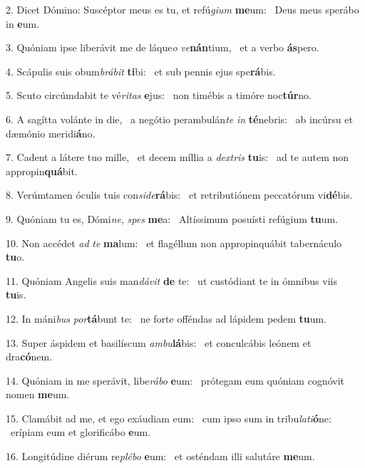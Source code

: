 2. Dicet Dómino: Suscéptor meus es tu, et refú\textit{gi}\textit{um} \textbf{me}um: \ast\  Deus meus sperábo in \textbf{e}um.\

3. Quóniam ipse liberávit me de láque\textit{o} \textit{ve}\textbf{nán}tium, \ast\  et a verbo \textbf{ás}pero.\

4. Scápulis suis obum\textit{brá}\textit{bit} \textbf{ti}bi: \ast\  et sub pennis ejus spe\textbf{rá}bis.\

5. Scuto circúmdabit te vé\textit{ri}\textit{tas} \textbf{e}jus: \ast\  non timébis a timóre noc\textbf{túr}no.\

6. A sagítta volánte in die, \dag\  a negótio perambulán\textit{te} \textit{in} \textbf{té}nebris: \ast\  ab incúrsu et dæmónio meridi\textbf{á}no.\

7. Cadent a látere tuo mille, \dag\  et decem míllia a \textit{dex}\textit{tris} \textbf{tu}is: \ast\  ad te autem non appropin\textbf{quá}bit.\

8. Verúmtamen óculis tuis con\textit{si}\textit{de}\textbf{rá}bis: \ast\  et retributiónem peccatórum vi\textbf{dé}bis.\

9. Quóniam tu es, Dómi\textit{ne}, \textit{spes} \textbf{me}a: \ast\  Altíssimum posuísti refúgium \textbf{tu}um.\

10. Non accédet \textit{ad} \textit{te} \textbf{ma}lum: \ast\  et flagéllum non appropinquábit tabernáculo \textbf{tu}o.\

11. Quóniam Angelis suis man\textit{dá}\textit{vit} \textbf{de} te: \ast\  ut custódiant te in ómnibus viis \textbf{tu}is.\

12. In máni\textit{bus} \textit{por}\textbf{tá}bunt te: \ast\  ne forte offéndas ad lápidem pedem \textbf{tu}um.\

13. Super áspidem et basilíscum \textit{am}\textit{bu}\textbf{lá}bis: \ast\  et conculcábis leónem et dra\textbf{có}nem.\

14. Quóniam in me sperávit, libe\textit{rá}\textit{bo} \textbf{e}um: \ast\  prótegam eum quóniam cognóvit nomen \textbf{me}um.\

15. Clamábit ad me, et ego exáudiam eum: \dag\  cum ipso sum in tribu\textit{la}\textit{ti}\textbf{ó}ne: \ast\  erípiam eum et glorificábo \textbf{e}um.\

16. Longitúdine diérum re\textit{plé}\textit{bo} \textbf{e}um: \ast\  et osténdam illi salutáre \textbf{me}um.\

